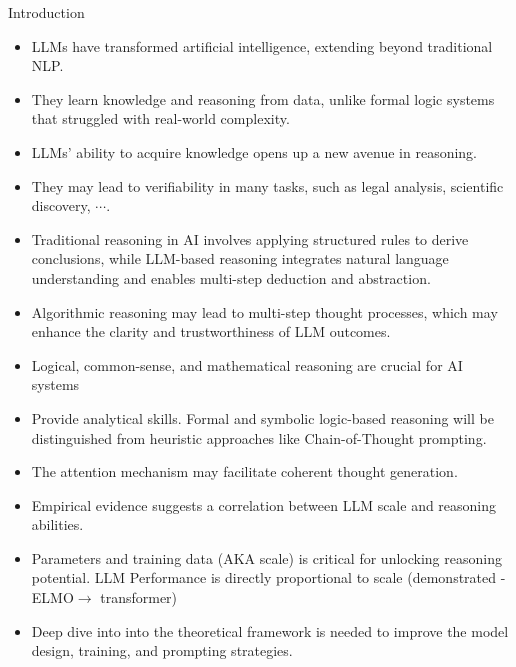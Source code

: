 \begin{frame}[allowframebreaks]{Introduction}
\begin{itemize}
    \item 	LLMs have transformed artificial intelligence, extending beyond traditional NLP.
	\item They learn knowledge and reasoning from data, unlike formal logic systems that struggled with real-world complexity.
	\item LLMs’ ability to acquire knowledge opens up a new avenue in reasoning.
	\item They may lead to verifiability in many tasks, such as legal analysis, scientific discovery, $\cdots$.
	\item Traditional reasoning in AI involves applying structured rules to derive conclusions, while LLM-based reasoning integrates natural language understanding and enables multi-step deduction and abstraction.
	\item Algorithmic reasoning may lead to multi-step thought processes, which may enhance the clarity and trustworthiness of LLM outcomes.
    \framebreak
    \item Logical, common-sense, and mathematical reasoning are crucial for AI systems
    \item Provide analytical skills. Formal and symbolic logic-based reasoning will be distinguished from heuristic approaches like Chain-of-Thought prompting.
    \item The attention mechanism may facilitate coherent thought generation.
    \item Empirical evidence suggests a correlation between LLM scale and reasoning abilities.
    \item Parameters and training data (AKA scale) is critical for unlocking reasoning potential. LLM Performance is directly proportional to scale (demonstrated - ELMO$ \rightarrow$ transformer)
    \item Deep dive into into the theoretical framework is needed to improve the model design, training, and prompting strategies.
\end{itemize}
\end{frame}

